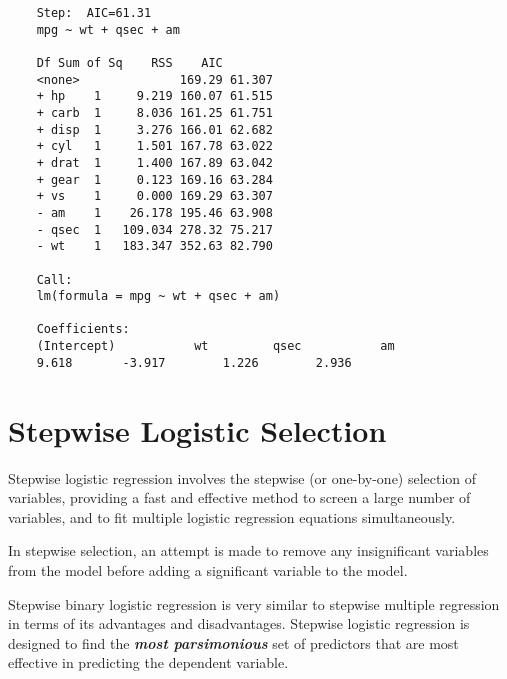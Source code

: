 \documentclass[a4paper,12pt]{article}
\begin{document}
\begin{framed}
	\begin{verbatim}
	Step:  AIC=61.31
	mpg ~ wt + qsec + am
	
	Df Sum of Sq    RSS    AIC
	<none>              169.29 61.307
	+ hp    1     9.219 160.07 61.515
	+ carb  1     8.036 161.25 61.751
	+ disp  1     3.276 166.01 62.682
	+ cyl   1     1.501 167.78 63.022
	+ drat  1     1.400 167.89 63.042
	+ gear  1     0.123 169.16 63.284
	+ vs    1     0.000 169.29 63.307
	- am    1    26.178 195.46 63.908
	- qsec  1   109.034 278.32 75.217
	- wt    1   183.347 352.63 82.790
	
	Call:
	lm(formula = mpg ~ wt + qsec + am)
	
	Coefficients:
	(Intercept)           wt         qsec           am
	9.618       -3.917        1.226        2.936
	\end{verbatim}
\end{framed}
\section{Stepwise Logistic Selection}
Stepwise logistic regression involves the stepwise (or one-by-one) selection of variables,
providing a fast and effective method to screen a large number of variables, and to fit
multiple logistic regression equations simultaneously.

In stepwise selection, an attempt is made to remove any insignificant variables from the model before adding a significant variable to the model.

Stepwise binary logistic regression is very similar to stepwise multiple regression in terms of its advantages and disadvantages. Stepwise logistic regression is designed to find the \textbf{\textit{most parsimonious}} set of predictors that are most effective in predicting the dependent variable.
\end{document}
